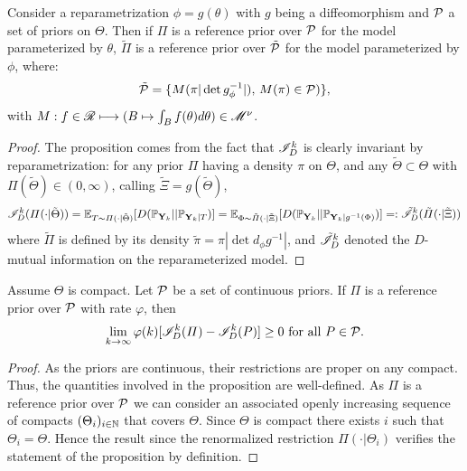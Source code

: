 \begin{prop}
    Consider a reparametrization $\phi=g(\theta)$ with $g$ being a diffeomorphism and $\mathcal{P}$ a set of priors on $\Theta$.
    Then if $\varPi$ is  a reference prior over $\mathcal{P}$ for the model parameterized by $\theta$, $\tilde{\varPi}$ is a reference prior over $\tilde{\mathcal{P}}$ for the model parameterized by $\phi$, where: 
    \begin{equation}
        \tilde{\mathcal{P}} = \{ M(\pi |\det g_\phi^{-1}|),\,M(\pi)\in\mathcal{P} ) \},
    \end{equation}
    with $M:f\in\mathscr{R}\longmapsto (B\mapsto\int_B f(\theta)d\theta)\in\mathscr{M}^\nu$. %
\end{prop}

\begin{proof}
    The proposition comes from the fact that $\mathscr{I}^k_D$ is
    clearly invariant by reparametrization: for any prior $\varPi$ having a density $\pi$ on $\Theta$, and any $\tilde\Theta\subset\Theta$ with $\varPi(\tilde\Theta)\in(0,\infty)$, calling $\tilde\Xi = g(\tilde\Theta) $,
        \begin{equation}
            \mathscr{I}^k_D(\varPi(\cdot|\tilde\Theta)) = \mathbb{E}_{T\sim\varPi(\cdot|\tilde\Theta)}[D(\mathbb{P}_{\mathbf{Y}_k}||\mathbb{P}_{\mathbf{Y}_k|T} )] = \mathbb{E}_{\Phi\sim\tilde\varPi(\cdot|\tilde\Xi)} [D(\mathbb{P}_{\mathbf{Y}_k}||\mathbb{P}_{\mathbf{Y}_k|g^{-1}(\Phi)} )] =: \tilde{\mathscr{I}}^k_D(\tilde\varPi(\cdot|\tilde\Xi))
        \end{equation}
    where $\tilde\varPi$ is defined by its density $\tilde\pi = \pi|\det d_\phi g^{-1}|$, and $\tilde{\mathscr{I}}^k_D$ denoted the $D$-mutual information on the reparameterized model.
\end{proof}

\begin{prop}
    Assume $\Theta$ is compact. Let $\mathcal{P}$ be a set of continuous priors. If $\varPi$ is a reference prior over $\mathcal{P}$ with rate $\varphi$, then
        \begin{equation}
            \lim_{k\rightarrow\infty} \varphi(k)[ \mathscr{I}_D^k(\varPi) -\mathscr{I}_D^k(P)] \geq0 \text{\ for all\ } P\in\mathcal{P}.
        \end{equation}
\end{prop}

\begin{proof}
    As the priors are continuous, their restrictions are proper on any compact. Thus, the quantities involved in the proposition are well-defined. 
    As $\varPi$ is a reference prior over $\mathcal{P}$ we can consider an associated openly increasing sequence of compacts $(\Theta_i)_{i\in\mathbb{N}}$ that covers $\Theta$. Since $\Theta$ is compact there exists $i$ such that $\Theta_i=\Theta$. Hence the result since the renormalized restriction $\varPi(\cdot|\Theta_i)$ verifies the statement of the proposition by definition.
\end{proof}

